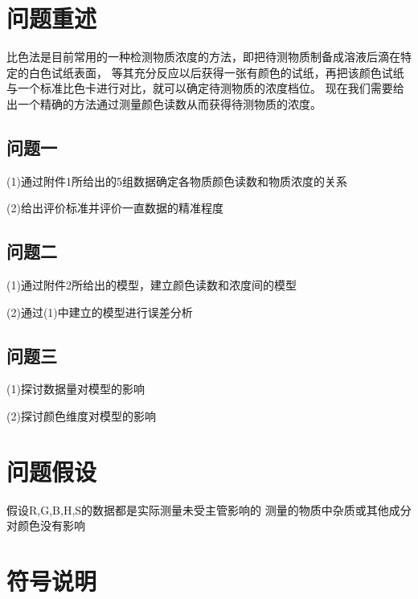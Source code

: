 \section{问题重述}
比色法是目前常用的一种检测物质浓度的方法，即把待测物质制备成溶液后滴在特定的白色试纸表面，
等其充分反应以后获得一张有颜色的试纸，再把该颜色试纸与一个标准比色卡进行对比，就可以确定待测物质的浓度档位。
现在我们需要给出一个精确的方法通过测量颜色读数从而获得待测物质的浓度。
\subsection{问题一}
(1)通过附件1所给出的5组数据确定各物质颜色读数和物质浓度的关系

(2)给出评价标准并评价一直数据的精准程度

\subsection{问题二}
(1)通过附件2所给出的模型，建立颜色读数和浓度间的模型

(2)通过(1)中建立的模型进行误差分析

\subsection{问题三}
(1)探讨数据量对模型的影响

(2)探讨颜色维度对模型的影响

\section{问题假设}
假设R,G,B,H,S的数据都是实际测量未受主管影响的
测量的物质中杂质或其他成分对颜色没有影响

\section{符号说明}
